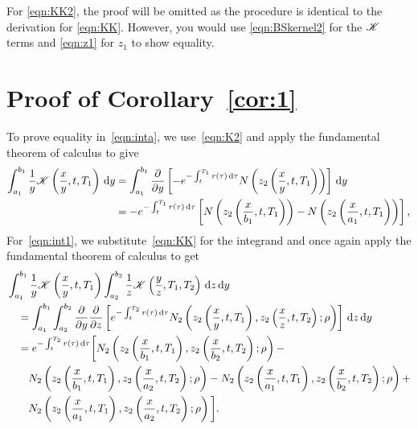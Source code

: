 		For \eqref{eqn:KK2}, the proof will be omitted as the procedure is identical to the derivation for \eqref{eqn:KK}. However, you would use \eqref{eqn:BSkernel2} for the $\mathscr K$ terms and \eqref{eqn:z1} for $z_1$ to show equality.
		
		\section{Proof of Corollary~\ref{cor:1}}
		To prove equality in~\eqref{eqn:inta}, we use~\eqref{eqn:K2} and apply the fundamental theorem of calculus to give
		\begin{align*}
			\int_{a_1}^{b_1} \frac{1}{y}\mathscr K\left( \frac{x}{y},t,T_1 \right) \, \mathrm d y &= \int_{a_1}^{b_1}\frac{\partial}{\partial y}\left[ -e^{-\int_t^{T_1} r(\tau) \, \mathrm d\tau} N\left(z_2\left(\frac{x}{y}, t, T_1\right)\right)  \right] \, \mathrm d y \\
			&= -e^{-\int_t^{T_1} r(\tau) \, \mathrm d\tau}\left[  N\left(z_2\left(\frac{x}{b_1}, t, T_1\right)\right) -N\left(z_2\left(\frac{x}{a_1}, t, T_1\right)\right) \right],
		\end{align*}
For~\eqref{eqn:int1}, we substitute~\eqref{eqn:KK} for the integrand and once again apply the fundamental theorem of calculus to get
	\begin{align*}
		&\int_{a_1}^{b_1} \frac{1}{y}\mathscr K\left( \frac{x}{y}, t, T_1 \right)\int_{a_2}^{b_2} \frac{1}{z}\mathscr K\left( \frac{y}{z}, T_1, T_2 \right) \, \mathrm d z \, \mathrm d y \\
		&\quad = \int_{a_1}^{b_1} \int_{a_2}^{b_2} \frac{\partial }{\partial y} \frac{\partial}{\partial z} \left[ e^{-\int_t^{T_2} r(\tau) \,\mathrm d\tau} N_2\left( z_2\left( \frac{x}{y}, t, T_1 \right), z_2\left( \frac{x}{z}, t, T_2 \right); \rho  \right)  \right] \, \mathrm d z \, \mathrm d y \\
		&\quad = e^{-\int_t^{T_2} r(\tau) \, \mathrm d\tau}\bigg[ N_2\left( z_2\left( \frac{x}{b_1}, t, T_1 \right), z_2\left( \frac{x}{b_2}, t, T_2 \right); \rho  \right) - \\
		&\qquad N_2\left( z_2\left( \frac{x}{b_1}, t, T_1 \right), z_2\left( \frac{x}{a_2}, t, T_2 \right); \rho  \right) - N_2\left( z_2\left( \frac{x}{a_1}, t, T_1 \right), z_2\left( \frac{x}{b_2}, t, T_2 \right); \rho  \right) + \\
		&\qquad N_2\left( z_2\left( \frac{x}{a_1}, t, T_1 \right), z_2\left( \frac{x}{a_2}, t, T_2 \right); \rho  \right)  \bigg].
	\end{align*}
